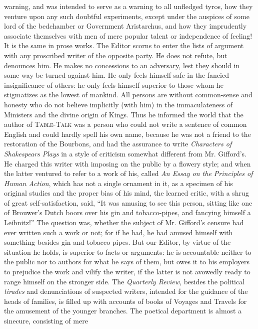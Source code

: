 warning, and was intended to serve as a warning to all unfledged
tyros, how they venture upon any such doubtful experiments, except
under the auspices of some lord of the bedchamber or Government
Aristarchus, and how they imprudently associate themselves with
men of mere popular talent or independence of feeling!\textemdash
It is the same in prose works. The Editor scorns to enter the
lists of argument with any proscribed writer of the opposite
party. He does not refute, but denounces him. He makes no
concessions to an adversary, lest they should in some way be
turned against him. He only feels himself safe in the fancied
insignificance of others: he only feels himself superior to those
whom he stigmatizes as the lowest of mankind. All persons are
without common-sense and honesty who do not believe implicitly
(with him) in the immaculateness of Ministers and the divine
origin of Kings.  Thus he informed the world that the author of
\textsc{Table-Talk} was a person who could not write a sentence of
common English and could hardly spell his own name, because he was
not a friend to the restoration of the Bourbons, and had the
assurance to write \emph{Characters of Shakespears Plays} in a
style of criticism somewhat different from Mr. Gifford's. He
charged this writer with imposing on the public by a flowery
style; and when the latter ventured to refer to a work of his,
called \emph{An Essay on the Principles of Human Action}, which
has not a single ornament in it, as a specimen of his original
studies and the proper bias of his mind, the learned critic, with
a shrug of great self-satisfaction, said, ``It was amusing to see
this person, sitting like one of Brouwer's Dutch boors over his
gin and tobacco-pipes, and fancying himself a Leibnitz!''  The
question was, whether the subject of Mr. Gifford's censure had
ever written such a work or not; for if he had, he had amused
himself with something besides gin and tobacco-pipes. But our
Editor, by virtue of the situation he holds, is superior to facts
or arguments: he is accountable neither to the public nor to
authors for what he says of them, but owes it to his employers to
prejudice the work and vilify the writer, if the latter is not
avowedly ready to range himself on the stronger side.\textemdash
The \emph{Quarterly Review}, besides the political \emph{tirades}
and denunciations of suspected writers, intended for the guidance
of the heads of families, is filled up with accounts of books of
Voyages and Travels for the amusement of the younger branches. The
poetical department is almost a sinecure, consisting of mere
